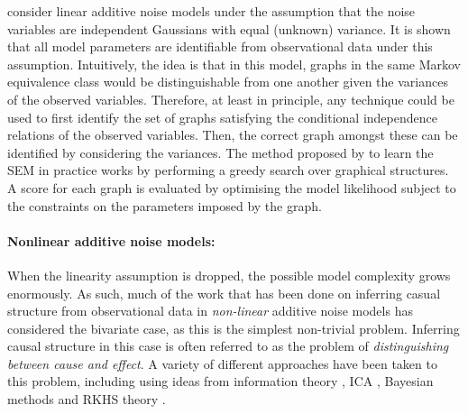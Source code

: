 \cite{peters2013identifiability} consider linear additive noise models under the assumption that the noise variables are independent Gaussians with equal (unknown) variance.
It is shown that all model parameters are identifiable from observational data under this assumption. 
Intuitively, the idea is that in this model, graphs in the same Markov equivalence class would be distinguishable from one another given the variances of the observed variables. 
Therefore, at least in principle, any technique could be used to first identify the set of graphs satisfying the conditional independence relations of the observed variables. 
Then, the correct graph amongst these can be identified by considering the variances. 
The method proposed by \cite{peters2013identifiability} to learn the SEM in practice works by performing a greedy search over graphical structures. 
A score for each graph is evaluated by optimising the model likelihood subject to the constraints on the parameters imposed by the graph.

\paragraph{Nonlinear additive noise models:}
When the linearity assumption is dropped, the possible model complexity grows enormously. As such, much of the work that has been done on inferring casual structure from observational data in \emph{non-linear} additive noise models has considered the bivariate case, as this is the simplest non-trivial problem. Inferring causal structure in this case is often referred to as the problem of \emph{distinguishing between cause and effect}. A variety of different approaches have been taken to this problem, including using ideas from information theory \citep{janzing2012information, janzing2010causal, janzing2009telling}, ICA \citep{hyvarinen2013pairwise, zhang2008distinguishing}, Bayesian methods \citep{mooij2010distinguishing, stegle2010probabilistic} and RKHS theory \citep{lopez2015towards}.

